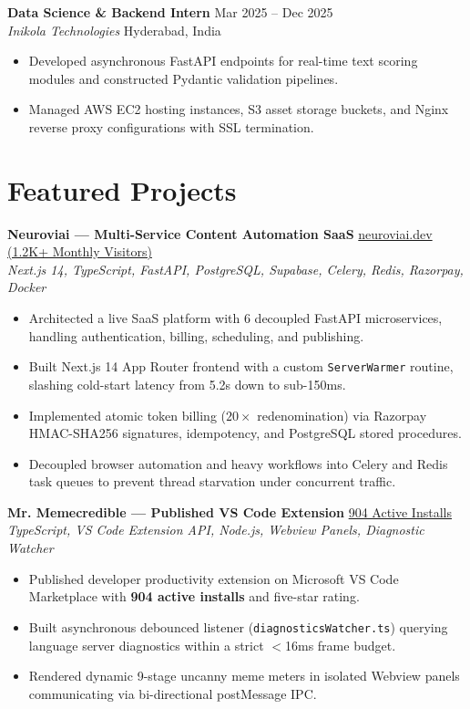 \documentclass[10pt]{article}
\begin{document}
\vspace{1.5pt}
\textbf{Data Science \& Backend Intern} \hfill Mar 2025 -- Dec 2025 \\
\textit{Inikola Technologies} \hfill Hyderabad, India
\begin{itemize}
    \item Developed asynchronous FastAPI endpoints for real-time text scoring modules and constructed Pydantic validation pipelines.
    \item Managed AWS EC2 hosting instances, S3 asset storage buckets, and Nginx reverse proxy configurations with SSL termination.
\end{itemize}

\section*{Featured Projects}
\textbf{Neuroviai — Multi-Service Content Automation SaaS} \hfill \href{https://neuroviai.dev}{neuroviai.dev (1.2K+ Monthly Visitors)} \\
\textit{Next.js 14, TypeScript, FastAPI, PostgreSQL, Supabase, Celery, Redis, Razorpay, Docker}
\begin{itemize}
    \item Architected a live SaaS platform with 6 decoupled FastAPI microservices, handling authentication, billing, scheduling, and publishing.
    \item Built Next.js 14 App Router frontend with a custom \texttt{ServerWarmer} routine, slashing cold-start latency from 5.2s down to sub-150ms.
    \item Implemented atomic token billing ($20\times$ redenomination) via Razorpay HMAC-SHA256 signatures, idempotency, and PostgreSQL stored procedures.
    \item Decoupled browser automation and heavy workflows into Celery and Redis task queues to prevent thread starvation under concurrent traffic.
\end{itemize}

\vspace{1.5pt}
\textbf{Mr. Memecredible — Published VS Code Extension} \hfill \href{https://marketplace.visualstudio.com/items?itemName=SangramjeetGhosh.mr-memecredible}{904 Active Installs} \\
\textit{TypeScript, VS Code Extension API, Node.js, Webview Panels, Diagnostic Watcher}
\begin{itemize}
    \item Published developer productivity extension on Microsoft VS Code Marketplace with \textbf{904 active installs} and five-star rating.
    \item Built asynchronous debounced listener (\texttt{diagnosticsWatcher.ts}) querying language server diagnostics within a strict $<$16ms frame budget.
    \item Rendered dynamic 9-stage uncanny meme meters in isolated Webview panels communicating via bi-directional postMessage IPC.
\end{itemize}
\end{document}
